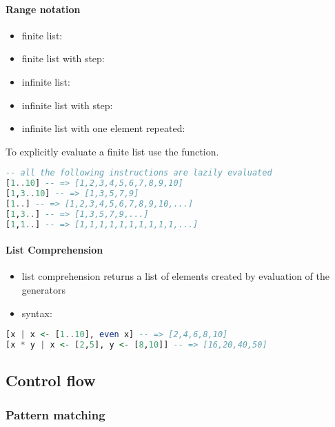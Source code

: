 \documentclass[a4paper,landscape,10pt]{article}
\begin{document}
\begin{multicols*}{2}
  \paragraph{Range notation}

  \begin{itemize}
    \item finite list: 
    \item finite list with step: 
    \item infinite list: \ihaskell{[<start>..]}
    \item infinite list with step: 
    \item infinite list with one element repeated: 
  \end{itemize}

  To explicitly evaluate a finite list use the  function.

  \begin{lstlisting}[language=Haskell]
-- all the following instructions are lazily evaluated
[1..10] -- => [1,2,3,4,5,6,7,8,9,10]
[1,3..10] -- => [1,3,5,7,9]
[1..] -- => [1,2,3,4,5,6,7,8,9,10,...]
[1,3..] -- => [1,3,5,7,9,...]
[1,1..] -- => [1,1,1,1,1,1,1,1,1,1,...]
\end{lstlisting}

  \paragraph{List Comprehension}

  \begin{itemize}
    \item list comprehension returns a list of elements created by evaluation of the generators
    \item syntax: 
  \end{itemize}

  \begin{lstlisting}[language=Haskell]
[x | x <- [1..10], even x] -- => [2,4,6,8,10]
[x * y | x <- [2,5], y <- [8,10]] -- => [16,20,40,50]
\end{lstlisting}

  \subsection{Control flow}

  \subsubsection{Pattern matching}


\end{multicols*}
\end{document}
